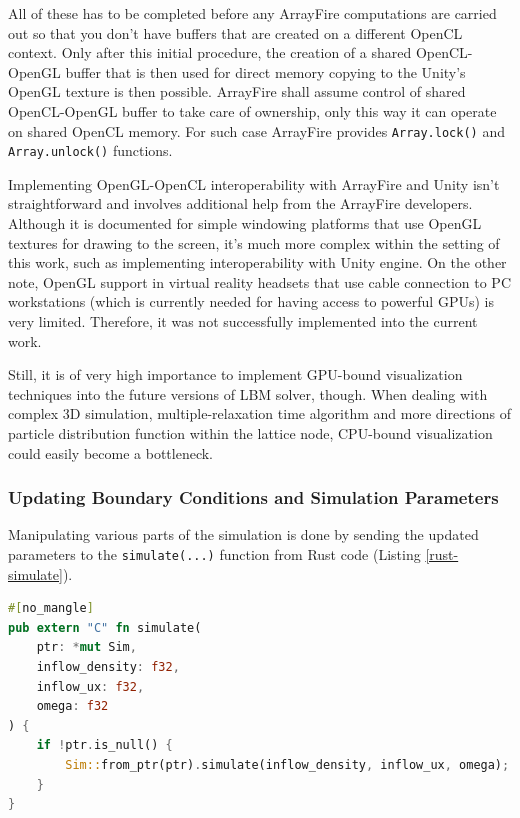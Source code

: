 All of these has to be completed before any ArrayFire computations are carried out so that you don't have buffers that are created on a different OpenCL context. Only after this initial procedure, the creation of a shared OpenCL-OpenGL buffer that is then used for direct memory copying to the Unity's OpenGL texture is then possible. ArrayFire shall assume control of shared OpenCL-OpenGL buffer to take care of ownership, only this way it can operate on shared OpenCL memory. For such case ArrayFire provides 
\texttt{Array.lock()} and \texttt{Array.unlock()} functions.

Implementing OpenGL-OpenCL interoperability with ArrayFire and Unity isn't straightforward and involves additional help from the ArrayFire developers. Although it is documented for simple windowing platforms that use OpenGL textures for drawing to the screen, it's much more complex within the setting of this work, such as implementing interoperability with Unity engine. On the other note, OpenGL support in virtual reality headsets that use cable connection to PC workstations (which is currently needed for having access to powerful GPUs) is very limited. Therefore, it was not successfully implemented into the current work. 

Still, it is of very high importance to implement GPU-bound visualization techniques into the future versions of LBM solver, though. When dealing with complex 3D simulation, multiple-relaxation time algorithm and more directions of particle distribution function within the lattice node, CPU-bound visualization could easily become a bottleneck.

\subsubsection{Updating Boundary Conditions and Simulation Parameters}
Manipulating various parts of the simulation is done by sending the updated parameters to the \texttt{simulate(...)} function from Rust code (Listing \ref{rust-simulate}).

\begin{lstlisting}[language=Rust, caption=\texttt{simulate} function that computes one iteration of a simulation., label=rust-simulate]
#[no_mangle]
pub extern "C" fn simulate(
	ptr: *mut Sim,
	inflow_density: f32,
	inflow_ux: f32,
	omega: f32
) {
	if !ptr.is_null() {
		Sim::from_ptr(ptr).simulate(inflow_density, inflow_ux, omega);
	}
}
\end{lstlisting}


